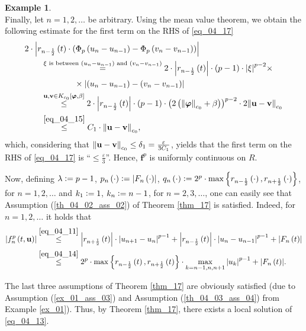 \documentclass[reqno]{amsart}
\numberwithin{equation}{section}
\theoremstyle{definition}
\newtheorem{example}{Example}
\theoremstyle{remark}
\newcommand{\assumptionRef}[1]{\textrm{Assumption (\ref{#1})}}
\newcommand{\ball}[3]{K_{#1}\sbr{#2,#3}}
\newcommand{\br}[1]{\left(#1\right)}
\newcommand{\bu}{\mathbf{u}}
\newcommand{\bv}{\mathbf{v}}
\newcommand{\bvarphi}{\boldsymbol{\varphi}}
\newcommand{\cbr}[1]{\left\{#1\right\}}
\newcommand{\defeq}{\vcentcolon=}
\newcommand{\eps}{\varepsilon}
\newcommand{\eqText}[1]{\stackrel{#1}{=}}
\newcommand{\exampleRef}[1]{\textrm{Example \ref{#1}}}
\newcommand{\leqText}[1]{\stackrel{#1}{\leq}}
\newcommand{\sbr}[1]{\left[#1\right]}
\newcommand{\theoremRef}[1]{\textrm{Theorem \ref{#1}}}
\begin{document}
\begin{example}
\begin{equation*}
		\end{equation*}
		Finally, let $n=1,2,\dots$ be arbitrary. Using the mean value theorem, we obtain the following estimate for the first term on the RHS of \eqref{eq_04_17}
		\begin{equation*}
			\begin{aligned}
				&2\cdot\abs{r_{n-\frac{1}{2}}\br{t}\cdot\br{\Phi_p\br{u_n-u_{n-1}}-\Phi_p\br{v_n-v_{n-1}}}}\\
				&\qquad\eqText{\xi\text{ is between }\br{u_n-u_{n-1}}\text{ and }\br{v_n-v_{n-1}}}2\cdot\abs{r_{n-\frac{1}{2}}\br{t}}\cdot\br{p-1}\cdot\abs{\xi}^{p-2}\times\\
				&\qquad\qquad\qquad\times\abs{\br{u_n-u_{n-1}}-\br{v_n-v_{n-1}}}\\
				&\qquad\leqText{\bu,\bv\in\ball{c_0}{\bvarphi}{\beta}}2\cdot\abs{r_{n-\frac{1}{2}}\br{t}}\cdot\br{p-1}\cdot\br{2\br{\norm{\bvarphi}_{c_0}+\beta}}^{p-2}\cdot2\norm{\bu-\bv}_{c_0}\\
				&\qquad\leqText{\eqref{eq_04_15}}C_1\cdot\norm{\bu-\bv}_{c_0},
			\end{aligned}
		\end{equation*}
		which, considering that $\norm{\bu-\bv}_{c_0}\leq\delta_1=\frac{\eps}{3C_1}$, yields that the first term on the RHS of \eqref{eq_04_17} is \enquote{$\leq\frac{\eps}{3}$}. Hence, $\mathbf{f}^p$ is uniformly continuous on $R$.
		
		Now, defining $\lambda\defeq{p}-1$, $p_n\br{\cdot}\defeq\abs{F_n\br{\cdot}}$, $q_n\br{\cdot}\defeq2^p\cdot\max\cbr{r_{n-\frac{1}{2}}\br{\cdot},r_{n+\frac{1}{2}}\br{\cdot}}$, for $n=1,2,\dots$ and $k_1\defeq1$, $k_n\defeq{n-1}$, for $n=2,3,\dots$, one can easily see that \assumptionRef{th_04_02_ass_02} of \theoremRef{thm_17} is satisfied. Indeed, for $n=1,2,\dots$ it holds that
		\begin{equation*}
			\begin{aligned}
				\abs{f_n^p\br{t,\bu}}&\leqText{\eqref{eq_04_11}}\abs{r_{n+\frac{1}{2}}\br{t}}\cdot\abs{u_{n+1}-u_n}^{p-1}+\abs{r_{n-\frac{1}{2}}\br{t}}\cdot\abs{u_n-u_{n-1}}^{p-1}+\abs{F_n\br{t}}\\
				&\leqText{\eqref{eq_04_14}}2^p\cdot\max\cbr{r_{n-\frac{1}{2}}\br{t},r_{n+\frac{1}{2}}\br{t}}\cdot\max_{k=n-1,n,n+1}\abs{u_k}^{p-1}+\abs{F_n\br{t}}.
			\end{aligned}
		\end{equation*}
		
		The last three assumptions of \theoremRef{thm_17} are obviously satisfied (due to \assumptionRef{ex_01_ass_03} and \assumptionRef{th_04_03_ass_04} from \exampleRef{ex_01}). Thus, by \theoremRef{thm_17}, there exists a local solution of \eqref{eq_04_13}.
	\end{example}
\end{document}
